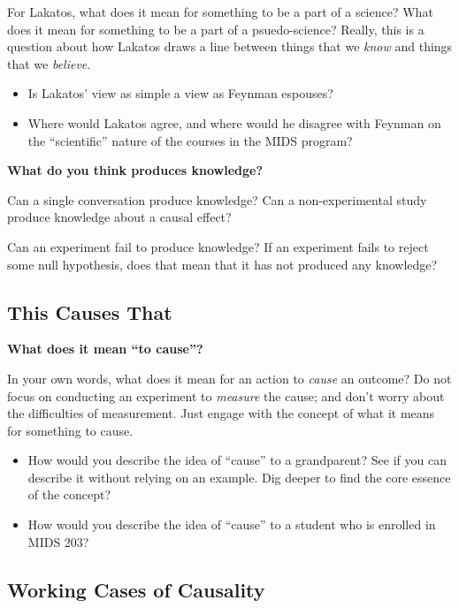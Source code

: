 \documentclass[
]{article}
\providecommand{\tightlist}{%
  \setlength{\itemsep}{0pt}\setlength{\parskip}{0pt}}
\theoremstyle{definition}
\theoremstyle{definition}
\theoremstyle{definition}
\theoremstyle{definition}
\theoremstyle{remark}
\begin{document}
For Lakatos, what does it mean for something to be a part of a science? What does it mean for something to be a part of a psuedo-science? Really, this is a question about how Lakatos draws a line between things that we \emph{know} and things that we \emph{believe}.

\begin{itemize}
\tightlist
\item
  Is Lakatos' view as simple a view as Feynman espouses?
\item
  Where would Lakatos agree, and where would he disagree with Feynman on the ``scientific'' nature of the courses in the MIDS program?
\end{itemize}

\textbf{What do you think produces knowledge?}

Can a single conversation produce knowledge? Can a non-experimental study produce knowledge about a causal effect?

Can an experiment fail to produce knowledge? If an experiment fails to reject some null hypothesis, does that mean that it has not produced any knowledge?

\subsection{This Causes That}\label{this-causes-that}

\textbf{What does it mean ``to cause''?}

In your own words, what does it mean for an action to \emph{cause} an outcome? Do not focus on conducting an experiment to \emph{measure} the cause; and don't worry about the difficulties of measurement. Just engage with the concept of what it means for something to cause.

\begin{itemize}
\tightlist
\item
  How would you describe the idea of ``cause'' to a grandparent? See if you can describe it without relying on an example. Dig deeper to find the core essence of the concept?
\item
  How would you describe the idea of ``cause'' to a student who is enrolled in MIDS 203?
\end{itemize}

\subsection{Working Cases of Causality}\label{working-cases-of-causality}
\end{document}
